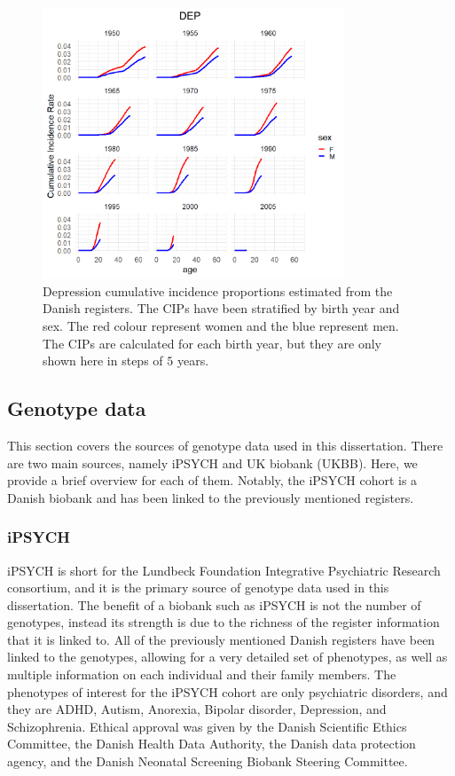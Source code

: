\begin{figure}
	\includegraphics[width=9cm]{methods/prevalencePlot_DEP.png}
	\caption[Cumulative incidence proportions estimated from the Danish 
	Registers]{Depression cumulative incidence proportions estimated from the 
	Danish registers. The CIPs have been stratified by birth year and sex. The 
	red colour represent women and the blue represent men. The CIPs are 
	calculated for each birth year, but they are only shown here in steps of $ 
	5 $ years.}
	\label{fig:CIP_DEP}
\end{figure}


\subsection{Genotype data}
This section covers the sources of genotype data used in this dissertation. There are two main sources, namely iPSYCH and UK biobank (UKBB). Here, we provide a brief overview for each of them. Notably, the iPSYCH cohort is a Danish biobank and has been linked to the previously mentioned registers. 


\subsubsection{iPSYCH}
iPSYCH is short for the Lundbeck Foundation Integrative Psychiatric Research consortium, and it is the primary source of genotype data 
used in this dissertation. The benefit of a biobank such as iPSYCH is not the number of genotypes, instead its strength is due to the 
richness of the register information that it is linked to. All of the previously mentioned Danish registers have been linked to the 
genotypes, allowing for a very detailed set of phenotypes, as well as multiple information on each individual and their family 
members. The phenotypes of interest for the iPSYCH cohort are only psychiatric disorders, and they are ADHD, Autism, Anorexia, Bipolar 
disorder, Depression, and Schizophrenia\cite{pedersen2018ipsych2012}. Ethical approval was given by the Danish Scientific Ethics 
Committee, the Danish Health Data Authority, the Danish data protection agency, and the Danish Neonatal Screening Biobank Steering 
Committee.

